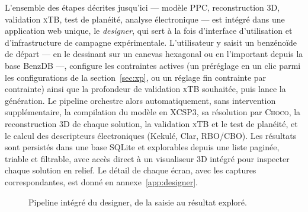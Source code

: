 \documentclass[11pt,a4paper]{article}
\newcommand{\xtb}{\textsc{xTB}}
\begin{document}
L'ensemble des étapes décrites jusqu'ici --- modèle PPC, reconstruction
3D, validation \xtb{}, test de planéité, analyse électronique --- est
intégré dans une application web unique, le \emph{designer}, qui sert à
la fois d'interface d'utilisation et d'infrastructure de campagne
expérimentale. L'utilisateur y saisit un benzénoïde de départ --- en le
dessinant sur un canevas hexagonal ou en l'important depuis la base
BenzDB ---, configure les contraintes actives (un préréglage en un clic
parmi les configurations de la section~\ref{sec:xp}, ou un réglage fin
contrainte par contrainte) ainsi que la profondeur de validation
\xtb{} souhaitée, puis lance la génération. Le pipeline orchestre alors
automatiquement, sans intervention supplémentaire, la compilation du
modèle en XCSP3, sa résolution par \textsc{Choco}, la reconstruction 3D de
chaque solution, la validation \xtb{} et le test de planéité, et le
calcul des descripteurs électroniques (Kekulé, Clar, RBO/CBO). Les
résultats sont persistés dans une base SQLite et explorables depuis une
liste paginée, triable et filtrable, avec accès direct à un
visualiseur 3D intégré pour inspecter chaque solution en relief. Le
détail de chaque écran, avec les captures correspondantes, est donné en
annexe~\ref{app:designer}.

\begin{figure}[h]
\centering
{}
\caption{Pipeline intégré du designer, de la saisie au résultat exploré.}
\label{fig:pipeline-designer}
\end{figure}
\end{document}
